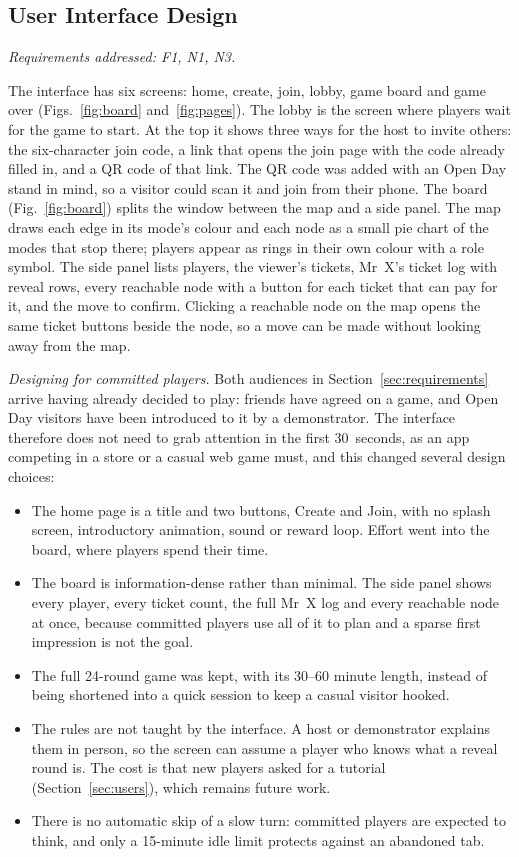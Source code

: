 \documentclass[lettersize,journal]{IEEEtran}
\newcommand{\reqs}[1]{\noindent\textit{Requirements addressed: #1.}\par\smallskip}
\begin{document}
\subsection{User Interface Design}\label{sec:ui}
\reqs{F1, N1, N3}
The interface has six screens: home, create, join, lobby, game board and game over (Figs.~\ref{fig:board} and~\ref{fig:pages}). The lobby is the screen where players wait for the game to start. At the top it shows three ways for the host to invite others: the six-character join code, a link that opens the join page with the code already filled in, and a QR code of that link. The QR code was added with an Open Day stand in mind, so a visitor could scan it and join from their phone. The board (Fig.~\ref{fig:board}) splits the window between the map and a side panel. The map draws each edge in its mode's colour and each node as a small pie chart of the modes that stop there; players appear as rings in their own colour with a role symbol. The side panel lists players, the viewer's tickets, Mr~X's ticket log with reveal rows, every reachable node with a button for each ticket that can pay for it, and the move to confirm. Clicking a reachable node on the map opens the same ticket buttons beside the node, so a move can be made without looking away from the map.

\emph{Designing for committed players.} Both audiences in Section~\ref{sec:requirements} arrive having already decided to play: friends have agreed on a game, and Open Day visitors have been introduced to it by a demonstrator. The interface therefore does not need to grab attention in the first 30~seconds, as an app competing in a store or a casual web game must, and this changed several design choices:
\begin{itemize}
	\item The home page is a title and two buttons, Create and Join, with no splash screen, introductory animation, sound or reward loop. Effort went into the board, where players spend their time.
	\item The board is information-dense rather than minimal. The side panel shows every player, every ticket count, the full Mr~X log and every reachable node at once, because committed players use all of it to plan and a sparse first impression is not the goal.
	\item The full 24-round game was kept, with its 30--60 minute length, instead of being shortened into a quick session to keep a casual visitor hooked.
	\item The rules are not taught by the interface. A host or demonstrator explains them in person, so the screen can assume a player who knows what a reveal round is. The cost is that new players asked for a tutorial (Section~\ref{sec:users}), which remains future work.
	\item There is no automatic skip of a slow turn: committed players are expected to think, and only a 15-minute idle limit protects against an abandoned tab.
\end{itemize}
\end{document}
